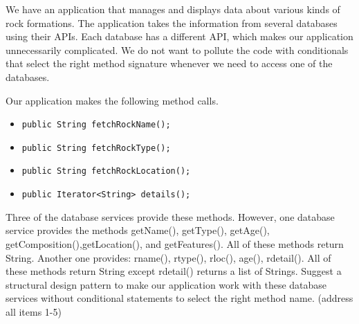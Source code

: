\question[12] We have an application that manages and displays data about various kinds of rock formations. The application takes the information from several databases using their APIs. Each database has a different API, which makes our application unnecessarily complicated. We do not want to pollute the code with conditionals that select the right method signature whenever we need to access one of the databases.

Our application makes the following method calls.
\begin{itemize}[label={}]
    \item \begin{verbatim} 
public String fetchRockName();
\end{verbatim} 
    \item \begin{verbatim} 
public String fetchRockType();
    \end{verbatim}
    \item \begin{verbatim} 
public String fetchRockLocation();
    \end{verbatim}
    \item \begin{verbatim} 
public Iterator<String> details();
    \end{verbatim}
\end{itemize}

Three of the database services provide these methods.
However, one database service provides the methods getName(), getType(), getAge(), getComposition(),getLocation(), and getFeatures(). All of these methods return String. 
Another one provides: rname(), rtype(), rloc(), age(), rdetail().  All of these methods return String except rdetail() returns a list of Strings.
Suggest a structural design pattern to make our application work with these database services without conditional statements to select the right method name.
(address all items 1-5)

\clearpage
